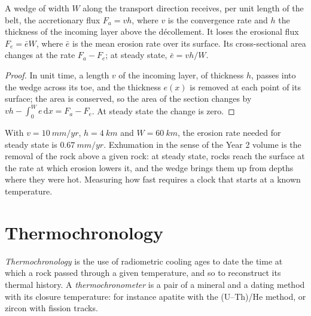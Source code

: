 \begin{proposition}\label{prop:b3:orogenic-wedges:flux}
A wedge of width $W$ along the transport direction receives, per unit length
of the belt, the accretionary flux $F_a = v h$, where $v$ is the convergence
rate and $h$ the thickness of the incoming layer above the décollement. It
loses the erosional flux $F_e = \bar e W$, where $\bar e$ is the mean erosion
rate over its surface. Its cross-sectional area changes at the rate $F_a -
F_e$; at steady state, $\bar e = vh/W$.
\end{proposition}

\begin{proof}
In unit time, a length $v$ of the incoming layer, of thickness $h$, passes
into the wedge across its toe, and the thickness $e(x)$ is removed at each
point of its surface; the area is conserved, so the area of the section
changes by $vh - \int_0^W e\,\mathrm dx = F_a - F_e$. At steady state the
change is zero.
\end{proof}

With $v = \qty{10}{mm/yr}$, $h = \qty{4}{km}$ and $W = \qty{60}{km}$, the
erosion rate needed for steady state is $\qty{0.67}{mm/yr}$. Exhumation in the
sense of the Year 2 volume is the removal of the rock above a given rock:
at steady state, rocks reach the surface at the rate at which erosion lowers
it, and the wedge brings them up from depths where they were hot. Measuring
how fast requires a clock that starts at a known temperature.

\section{Thermochronology}\label{sec:b3:orogenic-wedges:thermochronology}

\begin{definition}\label{def:b3:orogenic-wedges:thermochronology}
\emph{Thermochronology} is the use of radiometric
cooling ages to date the time at which a rock passed through a given
temperature, and so to reconstruct its thermal history. A
\emph{thermochronometer} is a pair of a mineral and
a dating method with its closure temperature: for instance apatite with the
(U--Th)/He method, or zircon with fission tracks.
\end{definition}

